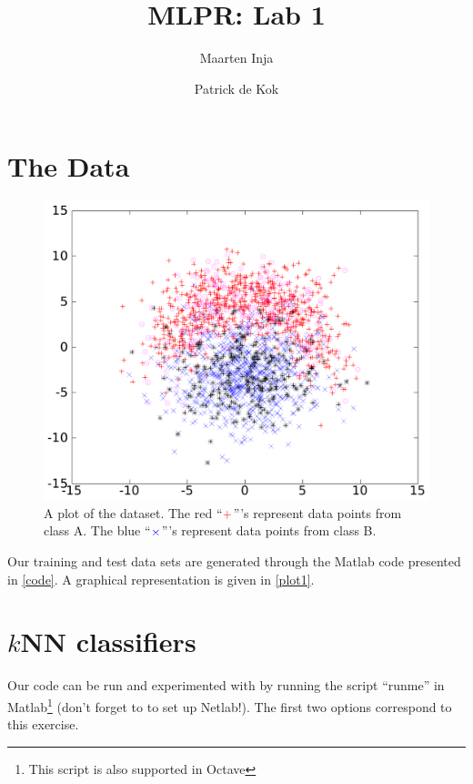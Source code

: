 \documentclass[a4paper,11pt]{article}
\author{Maarten Inja \and Patrick de Kok}
\title{MLPR: Lab 1}
\begin{document}
\maketitle

\section{The Data}
\begin{figure}[t]
  \begin{center}
    \caption{A plot of the dataset.  The red ``$\color{red}+$'''s represent data points from class A.  The blue ``$\color{blue}\times$'''s represent data points from class B.}
    \label{plot1}
    \includegraphics[width=0.6\paperwidth]{plot1}
  \end{center}
\end{figure}

Our training and test data sets are generated through the Matlab code presented in \autoref{code}.  A graphical representation is given in \autoref{plot1}.



\section{$k$NN classifiers}
\label{sec:two}
Our code can be run and experimented with by running the script ``runme'' 
in Matlab\footnote{This script is also supported in Octave} (don't forget to
to set up Netlab!).  
The first two options correspond to this exercise.  
\end{document}

